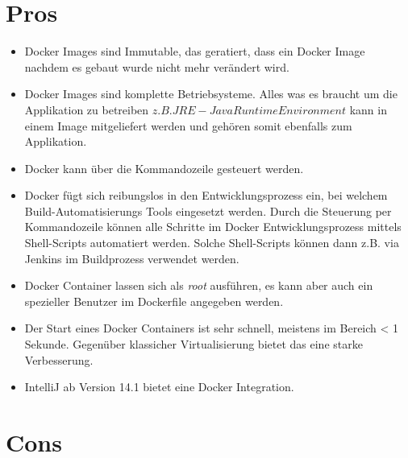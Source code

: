 \section{Pros}

\begin{itemize}

\item Docker Images sind Immutable, das geratiert, dass ein Docker Image nachdem es gebaut wurde
nicht mehr verändert wird.

\item Docker Images sind komplette Betriebsysteme. Alles was es braucht um die Applikation
zu betreiben \(z.B. JRE - Java Runtime Environment\) kann in einem Image mitgeliefert werden
und gehören somit ebenfalls zum Applikation.

\item Docker kann über die Kommandozeile gesteuert werden.

\item Docker fügt sich reibungslos in den Entwicklungsprozess ein, bei welchem Build-Automatisierungs
Tools eingesetzt werden. Durch die Steuerung per Kommandozeile können alle Schritte im Docker
Entwicklungsprozess mittels Shell-Scripts automatiert werden. Solche Shell-Scripts können dann z.B.
via Jenkins im Buildprozess verwendet werden.

\item Docker Container lassen sich als \textit{root} ausführen, es kann aber auch ein spezieller
Benutzer im Dockerfile angegeben werden.

\item Der Start eines Docker Containers ist sehr schnell, meistens im Bereich < 1 Sekunde.
Gegenüber klassicher Virtualisierung bietet das eine starke Verbesserung.

\item IntelliJ ab Version 14.1 bietet eine Docker Integration.

\end{itemize}

\section{Cons}

